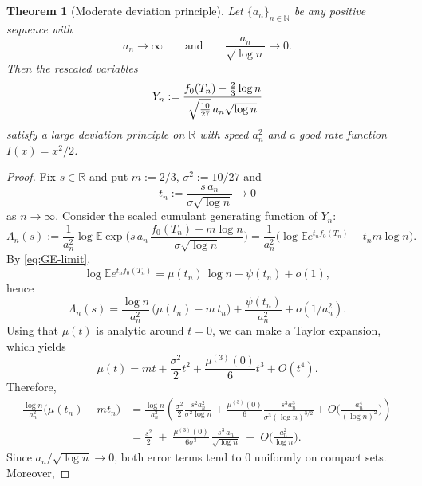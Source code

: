 \documentclass[11pt,a4paper]{article}
\numberwithin{equation}{section}
\newtheorem {theorem}{Theorem}[section]
\def\EE{\mathbb{E}}
\def\NN{\mathbb{N}}
\def\RR{\mathbb{R}}
\begin{document}
\begin{theorem}[Moderate deviation principle]\label{thm:MDP}
Let $\{a_n\}_{n\in\NN}$ be any positive sequence with
\begin{equation*}
a_n\to\infty\qquad\text{and}\qquad \frac{a_n}{\sqrt{\log n}}\to 0.
\end{equation*}
Then the rescaled variables
\begin{equation*}
Y_n:=\frac{f_0(T_n)-{2\over 3}\log n}{\sqrt{10\over 27}\,{a_n\sqrt{\log n}}}
\end{equation*}
satisfy a large deviation principle on $\RR$ with speed $a_n^2$ and a good rate function $I(x)=x^2/2$.
\end{theorem}
\begin{proof}
Fix $s\in\RR$ and put $m:=2/3$, $\sigma^2:=10/27$ and
\begin{equation*}
t_n:=\frac{s\,a_n}{\sigma\sqrt{\log n}}\to 0
\end{equation*}
as $n\to\infty$.
Consider the scaled cumulant generating function of $Y_n$:
\begin{equation*}
\Lambda_n(s):=\frac{1}{a_n^2}\log \EE\exp\Big(s\,a_n\,\frac{f_0(T_n)-m\log n}{\sigma\sqrt{\log n}}\Big)
=\frac{1}{a_n^2}\Big(\log \EE e^{t_n f_0(T_n)}-t_n m\log n\Big).
\end{equation*}
By \eqref{eq:GE-limit},
\begin{equation*}
\log \EE e^{t_n f_0(T_n)}=\mu(t_n)\,\log n+\psi(t_n)+o(1),
\end{equation*}
hence
\begin{equation*}
\Lambda_n(s)=\frac{\log n}{a_n^2}\,\big(\mu(t_n)-m\,t_n\big)
+\frac{\psi(t_n)}{a_n^2}+o(1/a_n^2).
\end{equation*}
Using that $\mu(t)$ is analytic around $t=0$, we can make a Taylor expansion, which yields
\begin{equation*}
\mu(t)=m t+\frac{\sigma^2}{2}t^2+\frac{\mu^{(3)}(0)}{6}t^3+O(t^4).
\end{equation*}
Therefore,
\begin{align*}
\frac{\log n}{a_n^2}\big(\mu(t_n)-m t_n\big)
&=\frac{\log n}{a_n^2}\left(\frac{\sigma^2}{2}\frac{s^2 a_n^2}{\sigma^2 \log n}
+\frac{\mu^{(3)}(0)}{6}\frac{s^3 a_n^3}{\sigma^3 (\log n)^{3/2}}
+O\Big(\frac{a_n^4}{(\log n)^2}\Big)\right)\\
&=\frac{s^2}{2}\;+\; \frac{\mu^{(3)}(0)}{6\sigma^3}\,\frac{s^3\,a_n}{\sqrt{\log n}}
\;+\;O\Big(\frac{a_n^2}{\log n}\Big).
\end{align*}
Since $a_n/\sqrt{\log n}\to 0$, both error terms tend to $0$ uniformly on compact sets. Moreover,

\end{proof}
\end{document}
